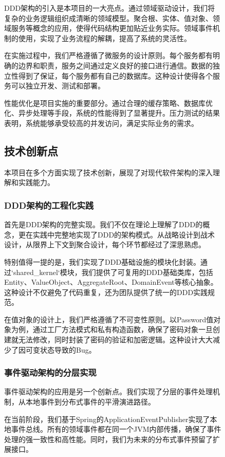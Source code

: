 \documentclass[a4paper,12pt]{article}
\begin{document}
\begin{figure}[H]
DDD架构的引入是本项目的一大亮点。通过领域驱动设计，我们将复杂的业务逻辑组织成清晰的领域模型。聚合根、实体、值对象、领域服务等概念的应用，使得代码结构更加贴近业务实际。领域事件机制的使用，实现了业务流程的解耦，提高了系统的灵活性。

在实施过程中，我们严格遵循了微服务的设计原则。每个服务都有明确的边界和职责，服务之间通过定义良好的接口进行通信。数据的独立性得到了保证，每个服务都有自己的数据库。这种设计使得各个服务可以独立开发、测试和部署。

性能优化是项目实施的重要部分。通过合理的缓存策略、数据库优化、异步处理等手段，系统的性能得到了显著提升。压力测试的结果表明，系统能够承受较高的并发访问，满足实际业务的需求。

\subsection{技术创新点}

本项目在多个方面实现了技术创新，展现了对现代软件架构的深入理解和实践能力。

\subsubsection{DDD架构的工程化实践}

首先是DDD架构的完整实现。我们不仅在理论上理解了DDD的概念，更在实践中完整地实现了DDD的架构模式。从战略设计到战术设计，从限界上下文到聚合设计，每个环节都经过了深思熟虑。

特别值得一提的是，我们实现了DDD基础设施的模块化封装。通过`shared_kernel`模块，我们提供了可复用的DDD基础类库，包括Entity、ValueObject、AggregateRoot、DomainEvent等核心抽象。这种设计不仅避免了代码重复，还为团队提供了统一的DDD实践规范。

在值对象的设计上，我们严格遵循了不可变性原则。以Password值对象为例，通过工厂方法模式和私有构造函数，确保了密码对象一旦创建就无法修改，同时封装了密码的验证和加密逻辑。这种设计大大减少了因可变状态导致的Bug。

\subsubsection{事件驱动架构的分层实现}

事件驱动架构的应用是另一个创新点。我们实现了分层的事件处理机制，从本地事件到分布式事件的平滑演进路径。

在当前阶段，我们基于Spring的ApplicationEventPublisher实现了本地事件总线。所有的领域事件都在同一个JVM内部传播，确保了事件处理的强一致性和高性能。同时，我们为未来的分布式事件预留了扩展接口。


\end{figure}
\end{document}
